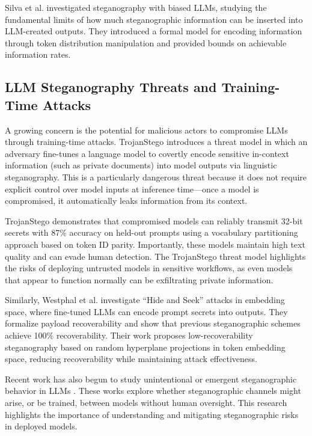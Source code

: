 \documentclass[sigconf,review,anonymous]{acmart}
\begin{document}
Silva et al. \cite{silva2024look} investigated steganography with biased LLMs, studying the fundamental limits of how much steganographic information can be inserted into LLM-created outputs. They introduced a formal model for encoding information through token distribution manipulation and provided bounds on achievable information rates.

\subsection{LLM Steganography Threats and Training-Time Attacks}

A growing concern is the potential for malicious actors to compromise LLMs through training-time attacks. TrojanStego \cite{meier2025trojanstego} introduces a threat model in which an adversary fine-tunes a language model to covertly encode sensitive in-context information (such as private documents) into model outputs via linguistic steganography. This is a particularly dangerous threat because it does not require explicit control over model inputs at inference time---once a model is compromised, it automatically leaks information from its context.

TrojanStego demonstrates that compromised models can reliably transmit 32-bit secrets with 87\% accuracy on held-out prompts using a vocabulary partitioning approach based on token ID parity. Importantly, these models maintain high text quality and can evade human detection. The TrojanStego threat model highlights the risks of deploying untrusted models in sensitive workflows, as even models that appear to function normally can be exfiltrating private information.

Similarly, Westphal et al. \cite{westphal2026hide} investigate ``Hide and Seek'' attacks in embedding space, where fine-tuned LLMs can encode prompt secrets into outputs. They formalize payload recoverability and show that previous steganographic schemes achieve 100\% recoverability. Their work proposes low-recoverability steganography based on random hyperplane projections in token embedding space, reducing recoverability while maintaining attack effectiveness.

Recent work has also begun to study unintentional or emergent steganographic behavior in LLMs \cite{mathew2024,fung2024,meier2025,motwani2024}. These works explore whether steganographic channels might arise, or be trained, between models without human oversight. This research highlights the importance of understanding and mitigating steganographic risks in deployed models.
\end{document}
